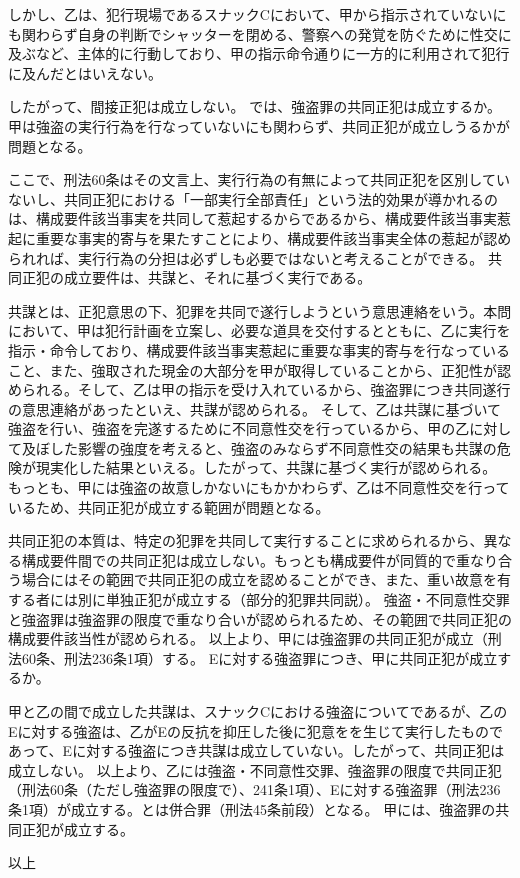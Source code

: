 \documentclass[11pt]{jsarticle}
\begin{document}
			しかし、乙は、犯行現場であるスナックCにおいて、甲から指示されていないにも関わらず自身の判断でシャッターを閉める、警察への発覚を防ぐために性交に及ぶなど、主体的に行動しており、甲の指示命令通りに一方的に利用されて犯行に及んだとはいえない。
			
			したがって、間接正犯は成立しない。
	\sectionB{}
		では、強盗罪の共同正犯は成立するか。甲は強盗の実行行為を行なっていないにも関わらず、共同正犯が成立しうるかが問題となる。
		
		\sectionC{}
			ここで、刑法60条はその文言上、実行行為の有無によって共同正犯を区別していないし、共同正犯における「一部実行全部責任」という法的効果が導かれるのは、構成要件該当事実を共同して惹起するからであるから、構成要件該当事実惹起に重要な事実的寄与を果たすことにより、構成要件該当事実全体の惹起が認められれば、実行行為の分担は必ずしも必要ではないと考えることができる。
		\sectionC{}
			共同正犯の成立要件は、共謀と、それに基づく実行である。
			
			\sectionD{}
				共謀とは、正犯意思の下、犯罪を共同で遂行しようという意思連絡をいう。本問において、甲は犯行計画を立案し、必要な道具を交付するとともに、乙に実行を指示・命令しており、構成要件該当事実惹起に重要な事実的寄与を行なっていること、また、強取された現金の大部分を甲が取得していることから、正犯性が認められる。そして、乙は甲の指示を受け入れているから、強盗罪につき共同遂行の意思連絡があったといえ、共謀が認められる。
			\sectionD{}
				そして、乙は共謀に基づいて強盗を行い、強盗を完遂するために不同意性交を行っているから、甲の乙に対して及ぼした影響の強度を考えると、強盗のみならず不同意性交の結果も共謀の危険が現実化した結果といえる。したがって、共謀に基づく実行が認められる。
		\sectionC{}
			もっとも、甲には強盗の故意しかないにもかかわらず、乙は不同意性交を行っているため、共同正犯が成立する範囲が問題となる。
			
			共同正犯の本質は、特定の犯罪を共同して実行することに求められるから、異なる構成要件間での共同正犯は成立しない。もっとも構成要件が同質的で重なり合う場合にはその範囲で共同正犯の成立を認めることができ、また、重い故意を有する者には別に単独正犯が成立する（部分的犯罪共同説）。
			強盗・不同意性交罪と強盗罪は強盗罪の限度で重なり合いが認められるため、その範囲で共同正犯の構成要件該当性が認められる。
		\sectionC{}
			以上より、甲には強盗罪の共同正犯が成立（刑法60条、刑法236条1項）する。
	\sectionB{}
		Eに対する強盗罪につき、甲に共同正犯が成立するか。
		
		甲と乙の間で成立した共謀は、スナックCにおける強盗についてであるが、乙のEに対する強盗は、乙がEの反抗を抑圧した後に犯意をを生じて実行したものであって、Eに対する強盗につき共謀は成立していない。したがって、共同正犯は成立しない。
	\sectionB{}
		以上より、乙には強盗・不同意性交罪、強盗罪の限度で共同正犯（刑法60条（ただし強盗罪の限度で）、241条1項）、Eに対する強盗罪（刑法236条1項）が成立する。とは併合罪（刑法45条前段）となる。
	\sectionB{}
		甲には、強盗罪の共同正犯が成立する。
\begin{flushright}
	以上
\end{flushright}
	
\end{document}
